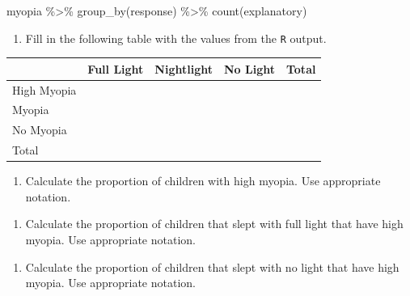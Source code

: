 \documentclass[
]{report}
\newenvironment{Shaded}{\begin{snugshade}}{\end{snugshade}}
\newcommand{\FunctionTok}[1]{\textcolor[rgb]{0.00,0.00,0.00}{#1}}
\newcommand{\NormalTok}[1]{#1}
\newcommand{\SpecialCharTok}[1]{\textcolor[rgb]{0.00,0.00,0.00}{#1}}
\providecommand{\tightlist}{%
  \setlength{\itemsep}{0pt}\setlength{\parskip}{0pt}}
\begin{document}
\begin{Shaded}
\begin{Highlighting}[]
\NormalTok{myopia }\SpecialCharTok{\%\textgreater{}\%} \FunctionTok{group\_by}\NormalTok{(response) }\SpecialCharTok{\%\textgreater{}\%} \FunctionTok{count}\NormalTok{(explanatory)}
\end{Highlighting}
\end{Shaded}

\begin{enumerate}
\def\labelenumi{\arabic{enumi}.}
\setcounter{enumi}{9}
\tightlist
\item
  Fill in the following table with the values from the \texttt{R} output.
\end{enumerate}

\begin{longtable}[]{@{}lllll@{}}
\toprule
& Full Light & Nightlight & No Light & Total \\
\midrule
\endhead
High Myopia & & & & \\
Myopia & & & & \\
No Myopia & & & & \\
Total & & & & \\
\bottomrule
\end{longtable}

\begin{enumerate}
\def\labelenumi{\arabic{enumi}.}
\setcounter{enumi}{10}
\tightlist
\item
  Calculate the proportion of children with high myopia. Use appropriate notation.
\end{enumerate}

\vspace{0.3in}

\begin{enumerate}
\def\labelenumi{\arabic{enumi}.}
\setcounter{enumi}{11}
\tightlist
\item
  Calculate the proportion of children that slept with full light that have high myopia. Use appropriate notation.
\end{enumerate}

\vspace{0.3in}

\begin{enumerate}
\def\labelenumi{\arabic{enumi}.}
\setcounter{enumi}{12}
\tightlist
\item
  Calculate the proportion of children that slept with no light that have high myopia. Use appropriate notation.
\end{enumerate}
\end{document}
